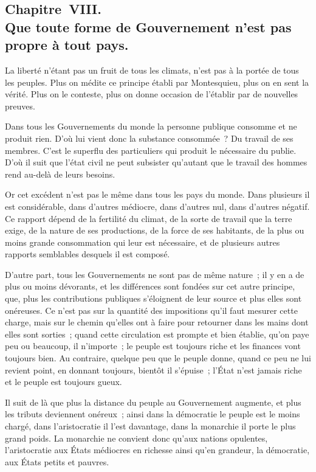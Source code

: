 \documentclass[french,twoside]{book} %
\begin{document}
\subsection[{Chapitre VIII. Que toute forme de Gouvernement n’est pas propre à tout pays.}]{Chapitre VIII. \\
Que toute forme de Gouvernement n’est pas propre à tout pays.}
\noindent La liberté n’étant pas un fruit de tous les climats, n’est pas à la portée de tous les peuples. Plus on médite ce principe établi par Montesquieu, plus on en sent la vérité. Plus on le conteste, plus on donne occasion de l’établir par de nouvelles preuves.\par
Dans tous les Gouvernements du monde la personne publique consomme et ne produit rien. D’où lui vient donc la substance consommée ? Du travail de ses membres. C’est le superflu des particuliers qui produit le nécessaire du publie. D’où il suit que l’état civil ne peut subsister qu’autant que le travail des hommes rend au-delà de leurs besoins.\par
Or cet excédent n’est pas le même dans tous les pays du monde. Dans plusieurs il est considérable, dans d’autres médiocre, dans d’autres nul, dans d’autres négatif. Ce rapport dépend de la fertilité du climat, de la sorte de travail que la terre exige, de la nature de ses productions, de la force de ses habitants, de la plus ou moins grande consommation qui leur est nécessaire, et de plusieurs autres rapports semblables desquels il est composé.\par
D’autre part, tous les Gouvernements ne sont pas de même nature ; il y en a de plus ou moins dévorants, et les différences sont fondées sur cet autre principe, que, plus les contributions publiques s’éloignent de leur source et plus elles sont onéreuses. Ce n’est pas sur la quantité des impositions qu’il faut mesurer cette charge, mais sur le chemin qu’elles ont à faire pour retourner dans les mains dont elles sont sorties ; quand cette circulation est prompte et bien établie, qu’on paye peu ou beaucoup, il n’importe ; le peuple est toujours riche et les finances vont toujours bien. Au contraire, quelque peu que le peuple donne, quand ce peu ne lui revient point, en donnant toujours, bientôt il s’épuise ; l’État n’est jamais riche et le peuple est toujours gueux.\par
Il suit de là que plus la distance du peuple au Gouvernement augmente, et plus les tributs deviennent onéreux ; ainsi dans la démocratie le peuple est le moins chargé, dans l’aristocratie il l’est davantage, dans la monarchie il porte le plus grand poids. La monarchie ne convient donc qu’aux nations opulentes, l’aristocratie aux États médiocres en richesse ainsi qu’en grandeur, la démocratie, aux États petits et pauvres.\par
\end{document}
